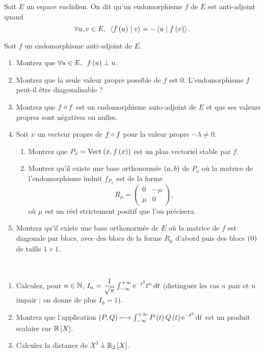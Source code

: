 \begin{exoss}
Soit \(E\) un espace euclidien. On dit qu'un endomorphisme \(f\) de \(E\) est anti-adjoint quand \[\quantifs{\forall u,v\in E}\ps{f\paren{u}}{v}=-\ps{u}{f\paren{v}}.\]

Soit \(f\) un endomorphisme anti-adjoint de \(E\).

\begin{enumerate}
    \item Montrez que \(\quantifs{\forall u\in E}f\paren{u}\perp u\). \\
    \item Montrez que la seule valeur propre possible de \(f\) est \(0\). L'endomorphisme \(f\) peut-il être diagonalisable ? \\
    \item Montrez que \(f\circ f\) est un endomorphisme auto-adjoint de \(E\) et que ses valeurs propres sont négatives ou nulles. \\
    \item Soit \(x\) un vecteur propre de \(f\circ f\) pour la valeur propre \(-\lambda\not=0\). \\ \begin{enumerate}
        \item Montrez que \(P_x=\Vect{x,f\paren{x}}\) est un plan vectoriel stable par \(f\). \\
        \item Montrez qu'il existe une base orthonormée \(\left(a,b\right)\) de \(P_x\) où la matrice de l'endomorphisme induit \(f_{P_x}\) est de la forme \[R_\mu=\begin{pmatrix}
            0 & -\mu \\
            \mu & 0
        \end{pmatrix},\] où \(\mu\) est un réel strictement positif que l'on précisera. \\
    \end{enumerate}
    \item Montrez qu'il existe une base orthonormée de \(E\) où la matrice de \(f\) est diagonale par blocs, avec des blocs de la forme \(R_\mu\) d'abord puis des blocs \(\left(0\right)\) de taille \(1\times1\).
\end{enumerate}
\end{exoss}

\begin{exo}~\\
\begin{enumerate}
    \item Calculez, pour \(n\in\mathbb{N}\), \(I_n=\dfrac{1}{\sqrt{\pi}}\int_{\minf}^{\pinf}\e{-t^2}t^n\odif{t}\) (distinguer les cas \(n\) pair et \(n\) impair ; on donne de plus \(I_0=1\)). \\
    \item Montrez que l'application \(\paren{P,Q}\mapsto\int_{\minf}^{\pinf}P\paren{t}Q\paren{t}\e{-t^2}\odif{t}\) est un produit scalaire sur \(\poly[\R]\). \\
    \item Calculez la distance de \(X^3\) à \(\polydeg[\R]{2}\).
\end{enumerate}
\end{exo}

